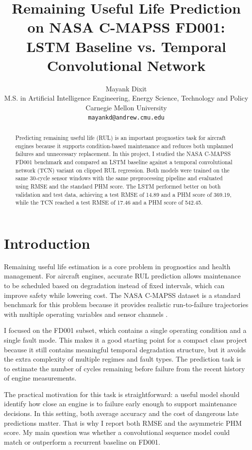 \documentclass{article}
\title{Remaining Useful Life Prediction on NASA C-MAPSS FD001:\\LSTM Baseline vs. Temporal Convolutional Network}
\author{
  Mayank Dixit \\
  M.S. in Artificial Intelligence Engineering, Energy Science, Technology and Policy \\
  Carnegie Mellon University \\
  \texttt{mayankd@andrew.cmu.edu}
}
\begin{document}
\maketitle

\begin{abstract}
Predicting remaining useful life (RUL) is an important prognostics task for aircraft engines because it supports condition-based maintenance and reduces both unplanned failures and unnecessary replacement. In this project, I studied the NASA C-MAPSS FD001 benchmark and compared an LSTM baseline against a temporal convolutional network (TCN) variant on clipped RUL regression. Both models were trained on the same 30-cycle sensor windows with the same preprocessing pipeline and evaluated using RMSE and the standard PHM score. The LSTM performed better on both validation and test data, achieving a test RMSE of 14.89 and a PHM score of 369.19, while the TCN reached a test RMSE of 17.46 and a PHM score of 542.45.
\end{abstract}

\section{Introduction}

Remaining useful life estimation is a core problem in prognostics and health management. For aircraft engines, accurate RUL prediction allows maintenance to be scheduled based on degradation instead of fixed intervals, which can improve safety while lowering cost. The NASA C-MAPSS dataset is a standard benchmark for this problem because it provides realistic run-to-failure trajectories with multiple operating variables and sensor channels \citep{nasa_cmapss}.

I focused on the FD001 subset, which contains a single operating condition and a single fault mode. This makes it a good starting point for a compact class project because it still contains meaningful temporal degradation structure, but it avoids the extra complexity of multiple regimes and fault types. The prediction task is to estimate the number of cycles remaining before failure from the recent history of engine measurements.

The practical motivation for this task is straightforward: a useful model should identify how close an engine is to failure early enough to support maintenance decisions. In this setting, both average accuracy and the cost of dangerous late predictions matter. That is why I report both RMSE and the asymmetric PHM score. My main question was whether a convolutional sequence model could match or outperform a recurrent baseline on FD001.
\end{document}
